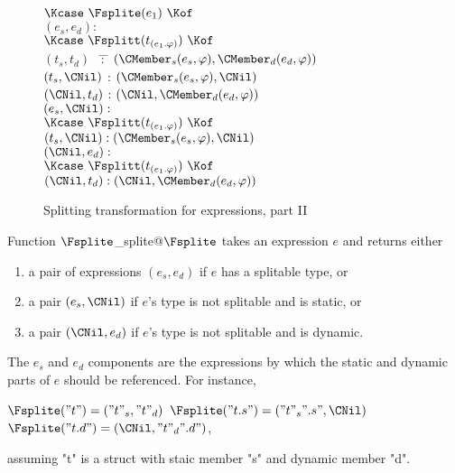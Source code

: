 \begin{docpart}
\begin{figure}[htbp]
\begin{center}
{{\begin{pseudocode}
            $\Kcase\ \Fsplite(e_1)\ \Kof$ \+\\
              $(e_s, e_d) : $ \+\\
                $\Kcase\ \Fsplitt(t_{(e_1.\varphi)})\ \Kof$ \+\\
                  $(t_s,t_d)$ \ \= : \= 
                    $(\CMember_s(e_s, \varphi), 
                      \CMember_d(e_d, \varphi))$ \\
                  $(t_s,\CNil)$ \> : \> 
                    $(\CMember_s(e_s, \varphi), \CNil)$ \\
                  $(\CNil,t_d)$ \> : \> 
                    $(\CNil, \CMember_d(e_d, \varphi))$ 
                    \-\-\\[1ex]
              $(e_s, \CNil) : $ \+\\
                $\Kcase\ \Fsplitt(t_{(e_1.\varphi)})\ \Kof$ \+\\
                  $(t_s,\CNil) : (\CMember_s(e_s, \varphi), \CNil)$
                    \-\-\\[1ex]
              $(\CNil, e_d) : $ \+\\
                $\Kcase\ \Fsplitt(t_{(e_1.\varphi)})\ \Kof$ \+\\
                  $(\CNil,t_d) : (\CNil, \CMember_d(e_d, \varphi))$
    \end{pseudocode}}}
    \caption{Splitting transformation for \coreC expressions, part II}
    \label{fig:PDSSplitExpressionsII}
  \end{center}
\end{figure}%

Function $\Fsplite$_{splite@$\Fsplite$} takes an expression $e$ and returns
either
\begin{enumerate}
\item a  pair of expressions $(e_s, e_d)$ if $e$ has a splitable type, or
\item a pair  $(e_s, \CNil)$ if $e$'s type is not splitable and
  is static, or
\item a pair $(\CNil, e_d)$ if $e$'s type is not splitable and
  is dynamic.
\end{enumerate}
The $e_s$ and $e_d$ components are the expressions by which the static and
dynamic parts of $e$ should be referenced. For instance,
\begin{center}
  $\Fsplite("t") = ("t"_s,"t"_d)$ \qquad 
  $\Fsplite("t.s") = ("t"_s".s", \CNil)$ \qquad
  $\Fsplite("t.d") = (\CNil,"t"_d".d")$,
\end{center}
assuming "t" is a struct with staic member "s" and dynamic member "d". 


\end{docpart}
